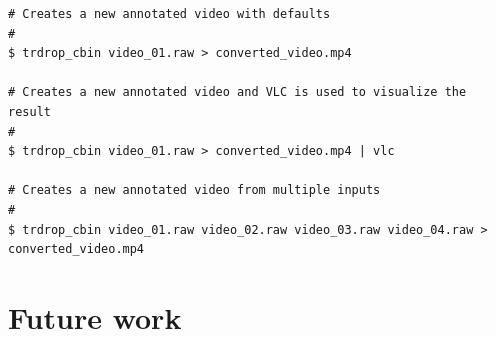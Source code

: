 \documentclass[titlepage]{article}
\begin{document}
\begin{verbatim}
# Creates a new annotated video with defaults
#
$ trdrop_cbin video_01.raw > converted_video.mp4

# Creates a new annotated video and VLC is used to visualize the result
#
$ trdrop_cbin video_01.raw > converted_video.mp4 | vlc

# Creates a new annotated video from multiple inputs
#
$ trdrop_cbin video_01.raw video_02.raw video_03.raw video_04.raw > converted_video.mp4
\end{verbatim}


\section{Future work}
\end{document}
